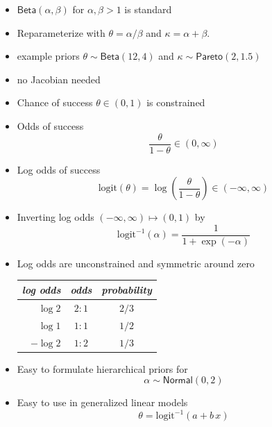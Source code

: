 \documentclass[10pt]{report}
\begin{document}
%
\begin{itemize}
\item $\mathsf{Beta}(\alpha, \beta)$ for $\alpha, \beta > 1$ is
  standard
\item Reparameterize with $\theta = \alpha / \beta$ and $\kappa =
  \alpha + \beta$.
\item example priors $\theta \sim \mathsf{Beta}(12, 4)$ and
$\kappa \sim  \mathsf{Pareto}(2, 1.5)$
\item no Jacobian needed
\end{itemize}

%
\begin{itemize}
\item Chance of success $\theta \in (0, 1)$ is constrained
\item Odds of success
\[
\frac{\theta}{1 - \theta} \in (0, \infty)
\]
\item Log odds of success
\[
\mathrm{logit}(\theta) = \log \left( \frac{\theta}{1 - \theta} \right)
\in (-\infty, \infty)
\]
\item Inverting log odds $(-\infty, \infty) \mapsto (0, 1)$ by
\[
\mbox{logit}^{-1}(\alpha) = \frac{1}{1 + \exp(-\alpha)}
\]
\end{itemize}

%
\begin{itemize}
\item Log odds are unconstrained and symmetric around zero
{\small
\begin{center}
\begin{tabular}{rcc}
{\slshape log odds} & {\slshape odds} & {\slshape probability}
 \\ \hline
$\log 2$ & $2 : 1$ & $2 / 3$
\\
$ \log 1$ & $1 : 1$ & $1 /2$
\\
$-\log 2$ &  $1:2$ & $1 / 3$
\end{tabular}
\end{center}
}
\item Easy to formulate hierarchical priors for
\[
\alpha \sim \mathsf{Normal}(0, 2)
\]
\item Easy to use in generalized linear models
\[
\theta = \mathrm{logit}^{-1}(a + b \, x)
\]
\end{itemize}
\end{document}
